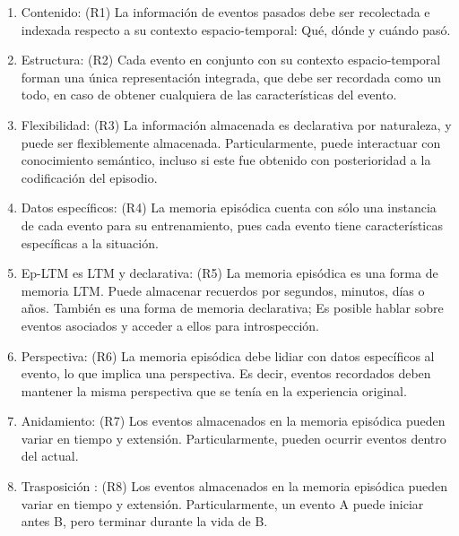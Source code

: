 \begin{enumerate}[topsep=0pt]
	\setlength\itemsep{0.2em}
	\item Contenido: (R1) La información de eventos pasados debe ser recolectada e indexada respecto a su contexto espacio-temporal: Qué, dónde y cuándo pasó.
	
	\item Estructura: (R2) Cada evento en conjunto con su contexto espacio-temporal forman una única representación integrada, que debe ser recordada como un todo, en caso de obtener cualquiera de las características del evento.
	
	\item Flexibilidad: (R3) La información almacenada es declarativa por naturaleza, y puede ser flexiblemente almacenada. Particularmente, puede interactuar con conocimiento semántico, incluso si este fue obtenido con posterioridad a la codificación del episodio.
	
	\item Datos específicos: (R4) La memoria episódica cuenta con sólo una instancia de cada evento para su entrenamiento, pues cada evento tiene características específicas a la situación.
	
	\item Ep-LTM es LTM y declarativa: (R5) La memoria episódica es una forma de memoria LTM. Puede almacenar recuerdos por segundos, minutos, días o años. También es una forma de memoria declarativa; Es posible hablar sobre eventos asociados y acceder a ellos para introspección.
	
	\item Perspectiva: (R6) La memoria episódica debe lidiar con datos específicos al evento, lo que implica una perspectiva. Es decir, eventos recordados deben mantener la misma perspectiva que se tenía en la experiencia original.
	
	\item Anidamiento: (R7) Los eventos almacenados en la memoria episódica pueden variar en tiempo y extensión. Particularmente, pueden ocurrir eventos dentro del actual.
	
	\item Trasposición : (R8) Los eventos almacenados en la memoria episódica pueden variar en tiempo y extensión. Particularmente, un evento A puede iniciar antes B, pero terminar durante la vida de B.
	
\end{enumerate}

